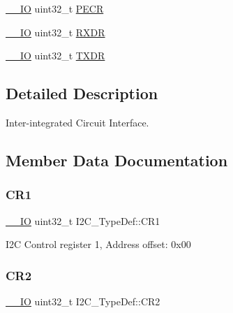 \begin{DoxyCompactItemize}
\item 
\mbox{\hyperlink{core__sc300_8h_aec43007d9998a0a0e01faede4133d6be}{\+\_\+\+\_\+\+IO}} uint32\+\_\+t \mbox{\hyperlink{struct_i2_c___type_def_a64c9036c1b58778cda97efa2e8a4be97}{P\+E\+CR}}
\item 
\mbox{\hyperlink{core__sc300_8h_aec43007d9998a0a0e01faede4133d6be}{\+\_\+\+\_\+\+IO}} uint32\+\_\+t \mbox{\hyperlink{struct_i2_c___type_def_a43d30d8efd8e4606663c7cb8d2565e12}{R\+X\+DR}}
\item 
\mbox{\hyperlink{core__sc300_8h_aec43007d9998a0a0e01faede4133d6be}{\+\_\+\+\_\+\+IO}} uint32\+\_\+t \mbox{\hyperlink{struct_i2_c___type_def_ad243ba45c86b31cb271ccfc09c920628}{T\+X\+DR}}
\end{DoxyCompactItemize}


\subsection{Detailed Description}
Inter-\/integrated Circuit Interface. 

\subsection{Member Data Documentation}
\mbox{\label{struct_i2_c___type_def_a91782f7b81475b0e3c3779273abd26aa}} 
\subsubsection{\texorpdfstring{CR1}{CR1}}
{\footnotesize\ttfamily \mbox{\hyperlink{core__sc300_8h_aec43007d9998a0a0e01faede4133d6be}{\+\_\+\+\_\+\+IO}} uint32\+\_\+t I2\+C\+\_\+\+Type\+Def\+::\+C\+R1}

I2C Control register 1, Address offset\+: 0x00 \mbox{\label{struct_i2_c___type_def_a29eb47db03d5ad7e9b399f8895f1768c}} 
\subsubsection{\texorpdfstring{CR2}{CR2}}
{\footnotesize\ttfamily \mbox{\hyperlink{core__sc300_8h_aec43007d9998a0a0e01faede4133d6be}{\+\_\+\+\_\+\+IO}} uint32\+\_\+t I2\+C\+\_\+\+Type\+Def\+::\+C\+R2}

